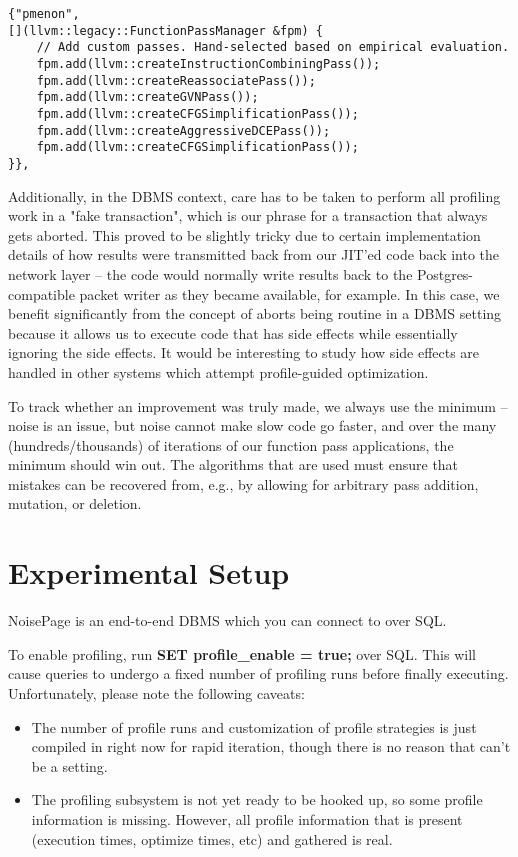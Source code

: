 \documentclass{vldb}
\newcommand{\dbCode}[1]{{\sffamily\small \textbf{#1}}\xspace}
\begin{document}
\begin{lstlisting}
{"pmenon",
[](llvm::legacy::FunctionPassManager &fpm) {
    // Add custom passes. Hand-selected based on empirical evaluation.
    fpm.add(llvm::createInstructionCombiningPass());
    fpm.add(llvm::createReassociatePass());
    fpm.add(llvm::createGVNPass());
    fpm.add(llvm::createCFGSimplificationPass());
    fpm.add(llvm::createAggressiveDCEPass());
    fpm.add(llvm::createCFGSimplificationPass());
}}, 
\end{lstlisting}

Additionally, in the DBMS context, care has to be taken to perform all profiling work in a "fake transaction", which is our phrase for a transaction that always gets aborted. This proved to be slightly tricky due to certain implementation details of how results were transmitted back from our JIT'ed code back into the network layer -- the code would normally write results back to the Postgres-compatible packet writer as they became available, for example. In this case, we benefit significantly from the concept of aborts being routine in a DBMS setting because it allows us to execute code that has side effects while essentially ignoring the side effects. It would be interesting to study how side effects are handled in other systems which attempt profile-guided optimization.

To track whether an improvement was truly made, we always use the minimum -- noise is an issue, but noise cannot make slow code go faster, and over the many (hundreds/thousands) of iterations of our function pass applications, the minimum should win out. The algorithms that are used must ensure that mistakes can be recovered from, e.g., by allowing for arbitrary pass addition, mutation, or deletion.


\section{Experimental Setup}

NoisePage is an end-to-end DBMS which you can connect to over SQL.

To enable profiling, run \dbCode{SET profile\_enable = true;} over SQL. This will cause queries to undergo a fixed number of profiling runs before finally executing. Unfortunately, please note the following caveats:
\begin{itemize}
    \item The number of profile runs and customization of profile strategies is just compiled in right now for rapid iteration, though there is no reason that can't be a setting.
    \item The profiling subsystem is not yet ready to be hooked up, so some profile information is missing. However, all profile information that is present (execution times, optimize times, etc) and gathered is real.
\end{itemize}
\end{document}
